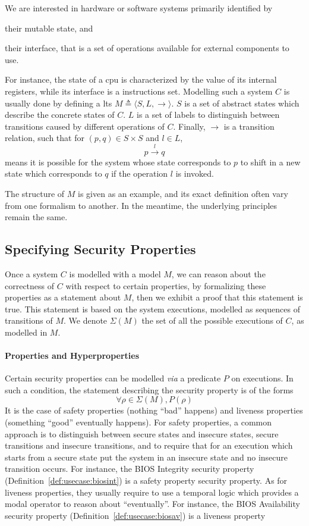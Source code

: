 We are interested in hardware or software systems primarily identified by
%
\begin{inparaenum}[(1)]
\item their mutable state, and
%
\item their interface, that is a set of operations available for external
  components to use.
\end{inparaenum}
%
For instance, the state of a \ac{cpu} is characterized by the value of its
internal registers, while its interface is a instructions set.
%
Modelling such a system $C$ is usually done by defining a \ac{lts}
$M \triangleq \langle S, L, \rightarrow \rangle$.
%
$S$ is a set of abstract states which describe the concrete states of $C$.
%
$L$ is a set of labels to distinguish between transitions caused by different
operations of $C$.
%
Finally, $\rightarrow$ is a transition relation, such that for
$(p, q) \in S \times S$ and $l \in L$,
%
\[ p \xrightarrow{l} q \]
%
means it is possible for the system whose state corresponds to $p$ to shift in a
new state which corresponds to $q$ if the operation $l$ is invoked.

The structure of $M$ is given as an example, and its exact definition often vary
from one formalism to another.
%
In the meantime, the underlying principles remain the same.

\subsection{Specifying Security Properties}
\label{subsec:state:secu}

Once a system $C$ is modelled with a model $M$, we can reason about the
correctness of $C$ with respect to certain properties, by formalizing these
properties as a statement about $M$, then we exhibit a proof that this statement
is true.
%
This statement is based on the system executions, modelled as sequences of
transitions of $M$.
%
We denote $\Sigma(M)$ the set of all the possible executions of $C$, as modelled
in $M$.

\paragraph{Properties and Hyperproperties}
%
Certain security properties can be modelled \emph{via} a predicate $P$ on
executions.
%
In such a condition, the statement describing the security property is of the
forms
%
\[
  \forall \rho \in \Sigma(M), P(\rho)
\]
%
It is the case of safety properties (nothing ``bad'' happens) and liveness
properties (something ``good'' eventually happens).
%
For safety properties, a common approach is to distinguish between secure states
and insecure states, secure transitions and insecure transitions, and to require
that for an execution which starts from a secure state put the system in an
insecure state and no insecure transition occurs.
%
For instance, the BIOS Integrity security property
(Definition~\ref{def:usecase:biosint}) is a safety property security property.
%
As for liveness properties, they usually require to use a temporal logic which
provides a modal operator to reason about ``eventually''.
%
For instance, the BIOS Availability security property
(Definition~\ref{def:usecase:biosav}) is a liveness property

